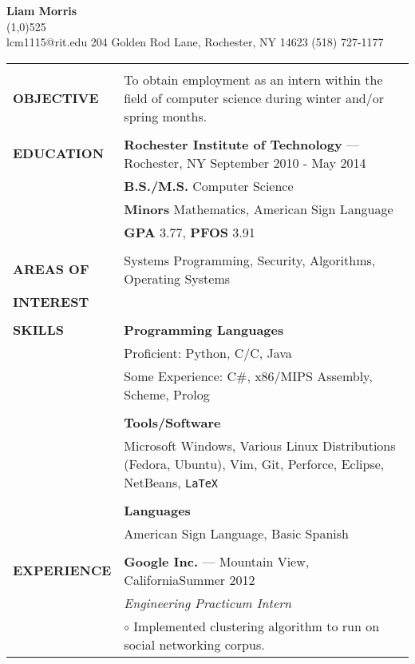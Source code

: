 \documentclass[11pt,letterpaper]{article}
\newcommand{\CPP}
{C\nolinebreak[4]\hspace{-.05em}\raisebox{.22ex}{\footnotesize\bf ++}}
\begin{document}
\raggedright

\textbf{\huge{Liam Morris}}\\
\vspace{-8pt}
\line(1,0){525}\\
lcm1115@rit.edu \hfill 204 Golden Rod Lane, Rochester, NY 14623 \hfill (518)
727-1177\\
\vspace{5pt}

\begin{tabular}{@{}lp{6.2in}}
&\\
\textbf{OBJECTIVE}
&To obtain employment as an intern within the field of
computer science during winter and/or spring months.\\
&\\
\textbf{EDUCATION}
&\textbf{Rochester Institute of Technology} --- Rochester, NY \hfill September 2010 - May 2014\\
&\textbf{B.S./M.S.} Computer Science\\
&\textbf{Minors} Mathematics, American Sign Language\\
&\textbf{GPA} 3.77, \textbf{PFOS} 3.91\\
&\\
\textbf{AREAS OF}
&Systems Programming, Security, Algorithms, Operating Systems\\
\textbf{INTEREST}&\\
&\\
\textbf{SKILLS}
&\textbf{Programming Languages}\\
&Proficient: Python, C/\CPP, Java\\
&Some Experience: C\#, x86/MIPS Assembly, Scheme, Prolog\\
&\\
&\textbf{Tools/Software}\\
&Microsoft Windows, Various Linux Distributions (Fedora, Ubuntu), Vim, Git,
  Perforce, Eclipse, NetBeans, \texttt{\LaTeX}\\
&\\
&\textbf{Languages}\\
&American Sign Language, Basic Spanish\\
&\\
\textbf{EXPERIENCE}
&\textbf{Google Inc.} --- Mountain View, California\hfill Summer 2012\\
&\emph{Engineering Practicum Intern}\\
&\hspace{10pt}$\circ$ Implemented clustering algorithm to run on social networking corpus.\\

\end{tabular}
\end{document}
